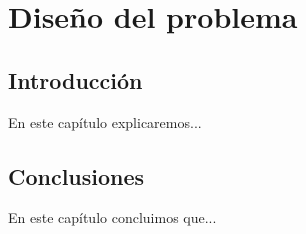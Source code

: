 \chapter{Diseño del problema}\label{cap:diseño}

\section{Introducción}
En este capítulo explicaremos...

\section{Conclusiones}
En este capítulo concluimos que...